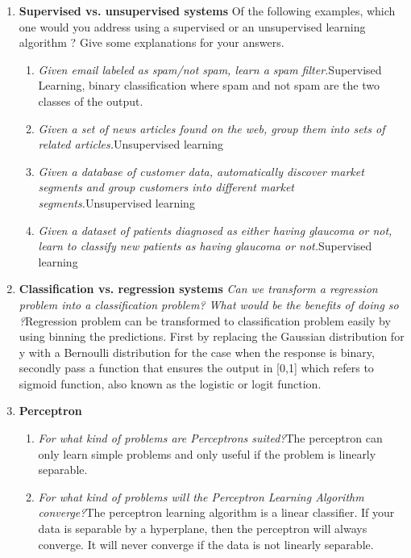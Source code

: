 \documentclass[onecolumn]{article}
\begin{document}
\begin{enumerate}
\item  \textbf{Supervised vs. unsupervised systems}\newline
Of the following examples, which one would you address using a supervised or an unsupervised learning algorithm ? Give some explanations for your answers.
	\begin{enumerate}
		\item \textit{Given email labeled as spam/not spam, learn a spam filter.}\newline Supervised Learning, binary classification where spam and not spam are the two classes of the output.
		\item \textit{Given a set of news articles found on the web, group them into sets of related articles.}\newline Unsupervised learning
		\item \textit{Given a database of customer data, automatically discover market segments and group customers into different market segments.}\newline Unsupervised learning
		\item \textit{Given a dataset of patients diagnosed as either having glaucoma or not, learn to classify new patients as having glaucoma or not.}\newline Supervised learning
	\end{enumerate}	
\item \textbf{Classification vs. regression systems}\newline
\textit{Can we transform a regression problem into a classification problem? What would be the benefits of doing so ?}\newline Regression problem can be transformed to classification problem easily by using binning the predictions. First by replacing the Gaussian distribution for y with a Bernoulli distribution for the case when the response is binary, secondly pass a function that ensures the output in [0,1] which refers to sigmoid function, also known as the logistic or logit function. 
\item \textbf{Perceptron}
	\begin{enumerate}
		\item \textit{For what kind of problems are Perceptrons suited?}\newline The perceptron can only learn simple problems and only useful if the problem is linearly separable.
		\item \textit{For what kind of problems will the Perceptron Learning Algorithm converge?}\newline The perceptron learning algorithm is a linear classifier. If your data is separable by a hyperplane, then the perceptron will always converge. It will never converge if the data is not linearly separable.

\end{enumerate}
\end{enumerate}
\end{document}
